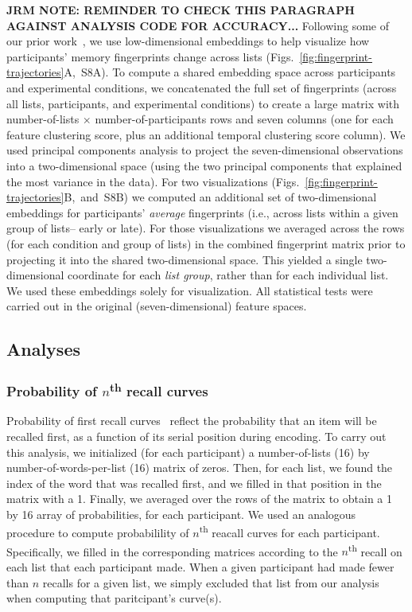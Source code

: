 \documentclass[11pt]{article}
\newcommand{\fingerprintTrajectoryRandom}{S8}
\begin{document}
\textbf{JRM NOTE: REMINDER TO CHECK THIS PARAGRAPH AGAINST ANALYSIS CODE FOR
ACCURACY...} Following some of our prior work~\citep{HeusEtal18a, HeusEtal21},
we use low-dimensional embeddings to help visualize how participants' memory
fingerprints change across lists
(Figs.~\ref{fig:fingerprint-trajectories}A,~\fingerprintTrajectoryRandom A). To
compute a shared embedding space across participants and experimental
conditions, we concatenated the full set of fingerprints (across all lists,
participants, and experimental conditions) to create a large matrix with
number-of-lists $\times$ number-of-participants rows and seven columns (one for
each feature clustering score, plus an additional temporal clustering score
column). We used principal components analysis to project the seven-dimensional
observations into a two-dimensional space (using the two principal components
that explained the most variance in the data). For two visualizations
(Figs.~\ref{fig:fingerprint-trajectories}B,~and~\fingerprintTrajectoryRandom B)
we computed an additional set of two-dimensional embeddings for participants'
\textit{average} fingerprints (i.e., across lists within a given group of
lists-- early or late). For those visualizations we averaged across the rows
(for each condition and group of lists) in the combined fingerprint matrix
prior to projecting it into the shared two-dimensional space. This yielded a
single two-dimensional coordinate for each \textit{list group}, rather than for
each individual list. We used these embeddings solely for visualization. All
statistical tests were carried out in the original (seven-dimensional) feature
spaces.

\subsection*{Analyses}

\subsubsection*{Probability of $n$\textsuperscript{th} recall curves}

Probability of first recall curves~\citep{AtkiShif68, PostPhil65, WelcBurn24}
reflect the probability that an item will be recalled first, as a function of
its serial position during encoding. To carry out this analysis, we initialized
(for each participant) a number-of-lists (16) by number-of-words-per-list (16)
matrix of zeros. Then, for each list, we found the index of the word that was
recalled first, and we filled in that position in the matrix with a 1. Finally,
we averaged over the rows of the matrix to obtain a 1 by 16 array of
probabilities, for each participant. We used an analogous procedure to compute
probabilility of $n$\textsuperscript{th} reacall curves for each participant.
Specifically, we filled in the corresponding matrices according to the
$n$\textsuperscript{th} recall on each list that each participant made. When a
given participant had made fewer than $n$ recalls for a given list, we simply
excluded that list from our analysis when computing that paritcipant's
curve(s).
\end{document}
